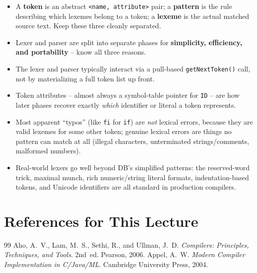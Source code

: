 \documentclass[full-course-notes.tex]{subfiles}
\begin{document}
\begin{takeaways}
\begin{itemize}
  \item A \textbf{token} is an abstract \texttt{<name, attribute>} pair; a \textbf{pattern} is
  the rule describing which lexemes belong to a token; a \textbf{lexeme} is the actual matched
  source text. Keep these three cleanly separated.
  \item Lexer and parser are split into separate phases for \textbf{simplicity, efficiency, and
  portability} -- know all three reasons.
  \item The lexer and parser typically interact via a pull-based \texttt{getNextToken()} call,
  not by materializing a full token list up front.
  \item Token attributes -- almost always a symbol-table pointer for \texttt{ID} -- are how
  later phases recover exactly \emph{which} identifier or literal a token represents.
  \item Most apparent ``typos'' (like \texttt{fi} for \texttt{if}) are \emph{not} lexical errors,
  because they are valid lexemes for some other token; genuine lexical errors are things no
  pattern can match at all (illegal characters, unterminated strings/comments, malformed
  numbers).
  \item Real-world lexers go well beyond DB's simplified patterns: the reserved-word trick,
  maximal munch, rich numeric/string literal formats, indentation-based tokens, and Unicode
  identifiers are all standard in production compilers.
\end{itemize}
\end{takeaways}

\section*{References for This Lecture}
\begin{thebibliography}{99}
 Aho, A.~V., Lam, M.~S., Sethi, R., and Ullman, J.~D. \textit{Compilers:
Principles, Techniques, and Tools}. 2nd~ed. Pearson, 2006.
 Appel, A.~W. \textit{Modern Compiler Implementation in C/Java/ML}. Cambridge
University Press, 2004.
\end{thebibliography}
\end{document}
